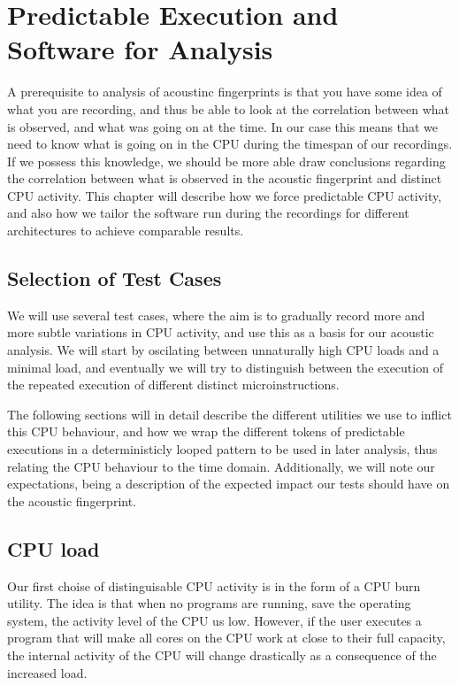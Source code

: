 \chapter{Predictable Execution and Software for Analysis}\label{chp:analyzing} 
A prerequisite to analysis of acoustinc fingerprints is that you have some idea of what you are recording, and thus be able to look at the correlation between what is observed, and what was going on at the time.
In our case this means that we need to know what is going on in the CPU during the timespan of our recordings.
If we possess this knowledge, we should be more able draw conclusions regarding the correlation between what is observed in the acoustic fingerprint and distinct CPU activity.
This chapter will describe how we force predictable CPU activity, and also how we tailor the software run during the recordings for different architectures to achieve comparable results.

\section{Selection of Test Cases}
We will use several test cases, where the aim is to gradually record more and more subtle variations in CPU activity, and use this as a basis for our acoustic analysis.
We will start by oscilating between unnaturally high CPU loads and a minimal load, and eventually we will try to distinguish between the execution of the repeated execution of different distinct microinstructions.

The following sections will in detail describe the different utilities we use to inflict this CPU behaviour, and how we wrap the different tokens of predictable executions in a deterministicly looped pattern to be used in later analysis, thus relating the CPU behaviour to the time domain. 
Additionally, we will note our expectations, being a description of the expected impact our tests should have on the acoustic fingerprint.

\section{CPU load}
Our first choise of distinguisable CPU activity is in the form of a CPU burn utility. 
The idea is that when no programs are running, save the operating system, the activity level of the CPU us low. 
However, if the user executes a program that will make all cores on the CPU work at close to their full capacity, the internal activity of the CPU will change drastically as a consequence of the increased load.

